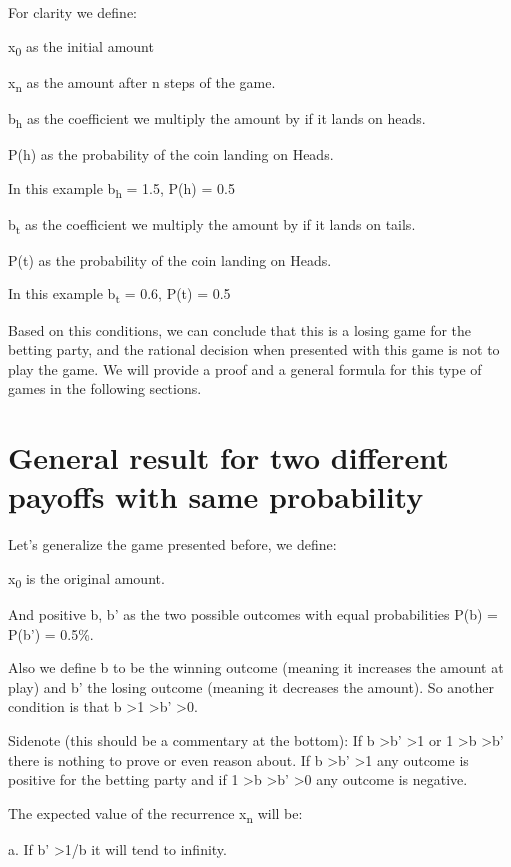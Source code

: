 \documentclass[12pt,reqno]{amsart}
\begin{document}
For clarity we define:

x\textsubscript{0} as the initial amount

x\textsubscript{n} as the amount after n steps of the game.

b\textsubscript{h} as the coefficient we multiply the amount by if it lands on heads.

P(h) as the probability of the coin landing on Heads. 

In this example b\textsubscript{h} = 1.5, P(h) = 0.5

b\textsubscript{t} as the coefficient we multiply the amount by if it lands on tails.

P(t) as the probability of the coin landing on Heads. 

In this example b\textsubscript{t} = 0.6, P(t) = 0.5

Based on this conditions, we can conclude that this is a losing game for the betting party, and the rational decision when presented with this game is not to play the game. We will provide a proof and a general formula for this type of games in the following sections.


\section{General result for two different payoffs with same probability}

Let's generalize the game presented before, we define:

x\textsubscript{0} is the original amount.

And positive b, b' as the two possible outcomes with equal probabilities P(b) = P(b') = 0.5\%. 

Also we define b to be the winning outcome (meaning it increases the amount at play) and b' the losing outcome (meaning it decreases the amount). So another condition is that b \textgreater 1 \textgreater b' \textgreater 0.

Sidenote (this should be a commentary at the bottom): If b \textgreater b' \textgreater 1 or 1 \textgreater b \textgreater b' there is nothing to prove or even reason about. If b \textgreater b' \textgreater 1 any outcome is positive for the betting party and if 1 \textgreater b \textgreater b' \textgreater 0 any outcome is negative. 


The expected value of the recurrence x\textsubscript{n} will be:

a. If b' \textgreater 1/b it will tend to infinity.
\end{document}
